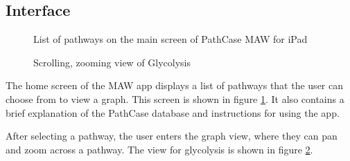\subsection{Interface}
\label{sect:maw_interface}

\begin{figure}
    \caption{\label{fig:maw_screenshot_list} List of pathways on the main screen
    of PathCase MAW for iPad}
\end{figure}

\begin{figure}[hbt]
    \caption{\label{fig:maw_screenshot_pathway} Scrolling, zooming view of
    Glycolysis}
\end{figure}

The home screen of the MAW app displays a list of pathways that the user can
choose from to view a graph. This screen is shown in figure
\ref{fig:maw_screenshot_list}. It also contains a brief explanation of the
PathCase database and instructions for using the app.

After selecting a pathway, the user enters the graph view, where they can pan
and zoom across a pathway. The view for glycolysis is shown in figure
\ref{fig:maw_screenshot_pathway}.
